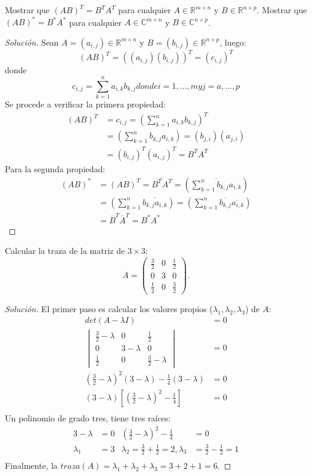\documentclass[12pt]{book}
\newcommand{\C}{\mathbb{C}}
\newcommand{\R}{\mathbb{R}}
\newenvironment{solucion}
  {\renewcommand\qedsymbol{$\square$}\begin{proof}[Solución]}
  {\end{proof}}
\begin{document}
\eje Mostrar que $(AB)^T = B^TA^T$ para cualquier $A\in\R^{m\times n}$ y $B\in\R^{n\times p}$. Mostrar que $(AB)^*= B^{*} A^{*}$ para cualquier $A\in\C^{m\times n}$ y $B\in\C^{n\times p}$.
\begin{solucion}
Sean $A=(a_{i,j})\in\R^{m\times n}$ y $B=(b_{i,j})\in\R^{n\times p}$, luego:
\[(AB)^T=((a_{i,j})(b_{i,j}))^T=(c_{i,j})^T\]
donde \[c_{i,j}=\sum_{k=1}^na_{i,k}b_{k,j} donde i=1, \dots, m y j=a, \dots, p\]
Se procede a verificar la primera propiedad:
\begin{align*}
    (AB)^T&=c_{i,j}=\left(\sum_{k=1}^na_{i,k}b_{k,j}\right)^T\\
    &=\left(\sum_{k=1}^nb_{k,j}a_{i,k}\right)=(b_{j,i})(a_{j,i})\\
    &=(b_{i,j})^T(a_{i,j})^T=B^TA^T
\end{align*}
Para la segunda propiedad:
\begin{align*}
    (AB)^*&=\overline{(AB)^T}=\overline{B^TA^T}=\left(\overline{\sum_{k=1}^nb_{k,j}a_{i,k}}\right)\\
    &=\left(\sum_{k=1}^n\overline{b_{k,j}a_{i,k}}\right)=\left(\sum_{k=1}^n\overline{b_{k,j}} \overline{a_{i,k}}\right)\\
    &=\overline{B}^T \overline{A}^T=B^*A^*
\end{align*}
\end{solucion}

\eje Calcular la traza de la matriz de $3\times3$:
\[
A=\begin{pmatrix}
\frac{3}{2} & 0 & \frac{1}{2}\\
0 & 3 & 0\\
\frac{1}{2} & 0 & \frac{3}{2}
\end{pmatrix}.
\]
\begin{solucion}
El primer paso es calcular los valores propios ($\lambda_1,\lambda_2,\lambda_3$) de $A$:
\begin{align*}
    det(A-\lambda I)&=0\\
    \begin{vmatrix}
        \frac{3}{2}-\lambda & 0 & \frac{1}{2}\\
        0 & 3-\lambda & 0\\
        \frac{1}{2} & 0 & \frac{3}{2}-\lambda
    \end{vmatrix} &=0\\
    \left(\frac{3}{2}-\lambda\right)^2(3-\lambda)-\frac{1}{4}(3-\lambda)&=0\\
    (3-\lambda)\left[\left(\frac{3}{2}-\lambda\right)^2-\frac{1}{4}\right]&=0\\
\end{align*}
Un polinomio de grado tres, tiene tres raíces:
\begin{align*}
    3-\lambda&=0 & \left(\frac{3}{2}-\lambda\right)^2-\frac{1}{4}&=0\\
    \lambda_1&=3 & \lambda_2=\frac{3}{2}+\frac{1}{2}=2, \lambda_3&=\frac{3}{2}-\frac{1}{2}=1\\
\end{align*}
Finalmente, la $traza(A)=\lambda_1+\lambda_2+\lambda_3=3+2+1=6$.
\end{solucion}
\end{document}
